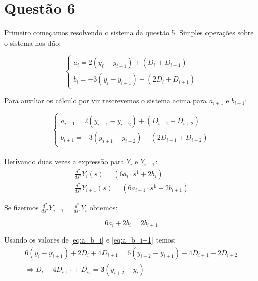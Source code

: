 \section*{Questão 6}

\paragraph{}Primeiro começamos resolvendo o sistema da questão 5.
Simples operações sobre o sistema nos dão:

\begin{equation}
\left\lbrace\begin{array}{ll}
		a_i = 2(y_i - y_{i+1}) + (D_i + D_{i+1}) \\
		b_i = -3(y_i - y_{i+1}) - (2D_i + D_{i+1})
	\end{array}\right.
	\label{eq:a_b_i}
\end{equation}

Para auxiliar os cálculo por vir rescrevemos o sistema acima para $a_{i+1}$
e $b_{i+1}$:

\begin{equation}
	\left\lbrace
	\begin{array}{ll}
		a_{i+1} = 2(y_{i+1} - y_{i+2}) + (D_{i+1} + D_{i+2}) \\
		b_{i+1} = -3(y_{i+1} - y_{i+2}) - (2D_{i+1} + D_{i+2})
	\end{array}
	\right.
	\label{eq:a_b_i+1}
\end{equation}

\paragraph{}Derivando duas vezes a expressão para $Y_i$ e $Y_{i+1}$:
\begin{equation}
\begin{array}{l}
	\frac{d^2}{ds^2}Y_i(s) = \left( 6a_i \cdot s^1 + 2b_i \right) \\
	\frac{d^2}{ds^2}Y_{i+1}(s) = \left( 6a_{i+1} \cdot s^1 + 2b_{i+1}
	\right) 
\end{array}
\end{equation}

Se fizermos $\frac{d^2}{ds^2}Y_{i+1} = \frac{d^2}{ds^2}Y_{i}$ obtemos:

\begin{equation}
6a_i + 2b_i = 2b_{i+1}
\end{equation}

Usando os valores de \ref{eq:a_b_i} e \ref{eq:a_b_i+1} temos:
\begin{equation}
\begin{array}{l}
6(y_i - y_{i+1}) + 2D_i + 4D_{i+1} = 6(y_{i+2} - y_{i+1}) - 4D_{i+1} - 2D_{i+2} \\
\Rightarrow  D_i + 4D_{i+1} + D_{i_2} = 3(y_{i+2} - y_{i})
\end{array}
\label{eq:n-2}
\end{equation}

